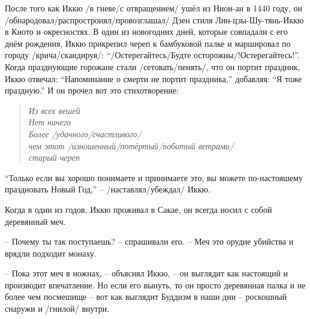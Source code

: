 \begin{ver}
После того как Иккю /в гневе/с отвращением/ ушёл из Ниои-ан в 1440
году, он /обнародовал/распростронял/провозглашал/ Дзен стиля
Лин-цзы-Шу-тянь-Иккю в Киото и окресностях. В один из новогодних 
дней, которые совпадали с его днём рождения, Иккю прикрепил череп к
бамбуковой палке и маршировал по городу /крича/скандируя/:
``/Остерегайтесь/Будте осторожны/!Остерегайтесь!''. Когда празднующие
горожане стали /сетовать/пенять/, что он портит праздник, Иккю
отвечал: ``Напоминание о смерти не портит праздника,'' добавляя: ``Я
тоже праздную.'' И он прочел вот это стихотворение:
\end{ver}

\begin{ver}
  \begin{verse}\it
    Из всех вешей\\
    Нет ничего\\
    Более /удачного/счастливого/\\
    чем этот /изношенный/потёртый/побитый ветрами/\\
    старый череп
  \end{verse}
\end{ver}

\begin{ver}
``Только если вы хорошо понимаете и принимаете это, вы можете
по-настояшему праздновать Новый Год,'' -- /наставлял/убеждал/ Иккю.
\end{ver}

\begin{ver}
Когда в один из годов, Иккю проживал в Сакае, он всегда носил с собой
деревянный меч.

-- Почему ты так поступаешь? -- спрашивали его. -- Меч это орудие
убийства и врядли подходит монаху.

-- Пока этот меч в ножнах, -- объяснял Иккю, -- он выглядит как настоящий
и производит впечатление. Но если его вынуть, то он просто деревянная
палка и не более чем посмешище -- вот как выглядит Буддизм в наши дни
-- роскошный снаружи и
/гнилой/ внутри.
\end{ver}
